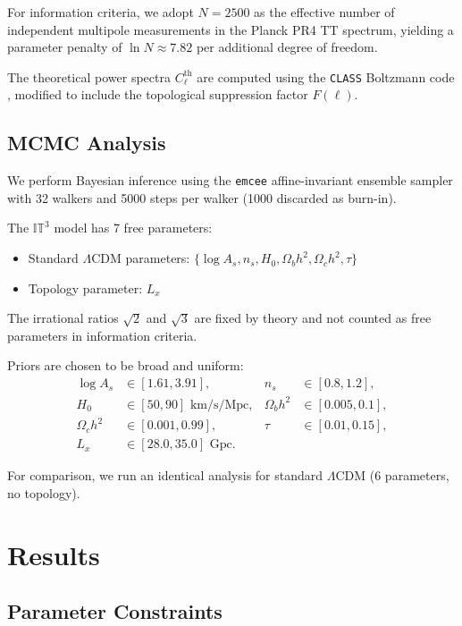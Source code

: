 \documentclass[a4paper,11pt]{article}
\begin{document}
For information criteria, we adopt $N=2500$ as the effective number of independent multipole measurements in the Planck PR4 TT spectrum, yielding a parameter penalty of $\ln N \approx 7.82$ per additional degree of freedom.

The theoretical power spectra $C_\ell^{\text{th}}$ are computed using the \texttt{CLASS} Boltzmann code \citep{CLASS2011}, modified to include the topological suppression factor $F(\ell)$.

\subsection{MCMC Analysis}

We perform Bayesian inference using the \texttt{emcee} affine-invariant ensemble sampler \citep{emcee2013} with 32 walkers and 5000 steps per walker (1000 discarded as burn-in).

The $\mathbb{IT}^3$ model has 7 free parameters:
\begin{itemize}
    \item Standard $\Lambda$CDM parameters: $\{\log A_s, n_s, H_0, \Omega_b h^2, \Omega_c h^2, \tau\}$
    \item Topology parameter: $L_x$
\end{itemize}

The irrational ratios $\sqrt{2}$ and $\sqrt{3}$ are fixed by theory and not counted as free parameters in information criteria.

Priors are chosen to be broad and uniform:
\begin{align}
    \log A_s &\in [1.61, 3.91], & n_s &\in [0.8, 1.2], \\
    H_0 &\in [50, 90] \text{ km/s/Mpc}, & \Omega_b h^2 &\in [0.005, 0.1], \\
    \Omega_c h^2 &\in [0.001, 0.99], & \tau &\in [0.01, 0.15], \\
    L_x &\in [28.0, 35.0] \text{ Gpc}.
\end{align}

For comparison, we run an identical analysis for standard $\Lambda$CDM (6 parameters, no topology).

\section{Results}

\subsection{Parameter Constraints}
\end{document}
